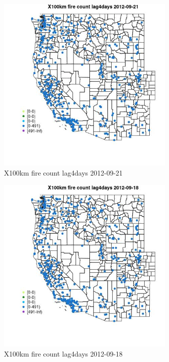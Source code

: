 \begin{figure} 
\centering  
\includegraphics[width=0.77\textwidth]{Code_Outputs/Report_ML_input_PM25_Step4_part_e_de_duplicated_aves_compiled_2019-05-14wNAs_MapObsX100km_fire_count_lag4days2012-09-21.jpg} 
\caption{\label{fig:Report_ML_input_PM25_Step4_part_e_de_duplicated_aves_compiled_2019-05-14wNAsMapObsX100km_fire_count_lag4days2012-09-21}X100km fire count lag4days 2012-09-21} 
\end{figure} 
 

\begin{figure} 
\centering  
\includegraphics[width=0.77\textwidth]{Code_Outputs/Report_ML_input_PM25_Step4_part_e_de_duplicated_aves_compiled_2019-05-14wNAs_MapObsX100km_fire_count_lag4days2012-09-18.jpg} 
\caption{\label{fig:Report_ML_input_PM25_Step4_part_e_de_duplicated_aves_compiled_2019-05-14wNAsMapObsX100km_fire_count_lag4days2012-09-18}X100km fire count lag4days 2012-09-18} 
\end{figure} 
 

